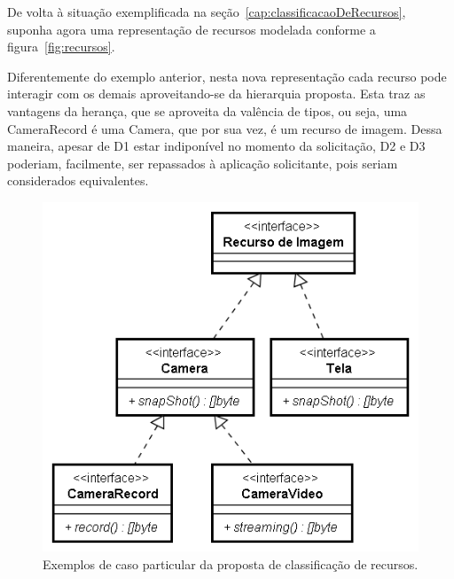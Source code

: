 De volta à situação exemplificada na seção~\ref{cap:classificacaoDeRecursos}, suponha agora uma representação de recursos modelada conforme a figura~\ref{fig:recursos}. 

Diferentemente do exemplo anterior, nesta nova representação cada recurso pode interagir com os demais aproveitando-se da hierarquia proposta. Esta traz as vantagens da herança, que se aproveita da valência de tipos, ou seja, uma CameraRecord é uma Camera, que por sua vez, é um recurso de imagem. Dessa maneira, apesar de D1 estar indiponível no momento da solicitação, D2 e D3 poderiam, facilmente, ser repassados à aplicação solicitante, pois seriam considerados equivalentes.

\begin{figure}[ht]
	\center
	\includegraphics[scale=0.8]{imagens/diagramaRecursosProposta}
	\caption{Exemplos de caso particular da proposta de classificação de recursos.}
	\label{fig:diagramaRecursosProposta}
\end{figure}

